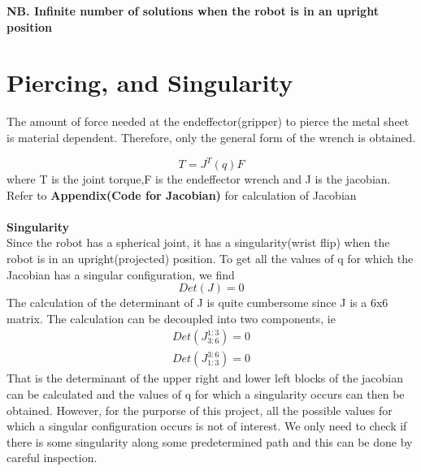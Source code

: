 \documentclass[12pt]{article}
\begin{document}
\textbf{NB. Infinite number of solutions when the robot is in an upright position}
\section{Piercing, and Singularity}
The amount of force needed at the endeffector(gripper)  to pierce the metal sheet is material dependent.
Therefore, only the general form of the wrench is obtained.

\begin{equation}
   T = J^T(q)F
\end{equation}
where T is the  joint torque,F is the endeffector wrench and J is the jacobian.
Refer to \textbf{Appendix(Code for Jacobian)} for  calculation of Jacobian \\ \\
\textbf{Singularity} \\
Since the robot has a spherical joint, it has a singularity(wrist flip) when the robot is in an upright(projected) position.
To get all the values of q for which the Jacobian has a singular configuration,
we find   
\begin{equation}
  Det(J) = 0
\end{equation}
The calculation of the determinant of J is quite cumbersome since J is a 6x6 matrix.
The calculation can be decoupled into two components, ie 
\begin{align}
  Det(J_{3:6}^{1:3}) =0 \\
  Det(J_{1:3}^{3:6}) =0
\end{align}
That is the determinant of the upper right and lower left blocks of the jacobian can be calculated and the values of q for which
a singularity occurs can then be obtained. 
However, for the purporse of this project, all the possible values for which a singular configuration occurs is not of interest.
We only need to check if there is some singularity along some predetermined path and this can be done by careful inspection.
\end{document}
